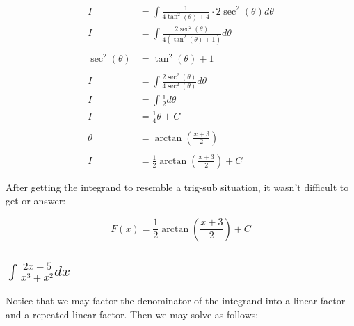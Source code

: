 \documentclass[12pt]{article}
\begin{document}
\begin{align}
    \nonumber                                                                                  \\
    I              & = \int \frac{1}{4\tan^2(\theta) + 4} \cdot 2\sec^2(\theta) d\theta        \\
    I              & = \int \frac{2\sec^2(\theta)}{4(\tan^2(\theta) + 1)} d\theta              \\
    \nonumber                                                                                  \\
    \sec^2(\theta) & = \tan^2(\theta) + 1                                                      \\
    \nonumber                                                                                  \\
    I              & = \int \frac{2\sec^2(\theta)}{4\sec^2(\theta)} d\theta                    \\
    I              & = \int \frac{1}{2} d\theta                                                \\
    I              & = \frac{1}{4} \theta + C                                                  \\
    \nonumber                                                                                  \\
    \theta         & = \arctan\left(\frac{x+3}{2}\right)                                       \\
    \nonumber                                                                                  \\
    I              & = \frac{1}{2} \arctan\left(\frac{x+3}{2}\right) + C
\end{align}


After getting the integrand to resemble a trig-sub situation, it wasn't difficult to get or answer:

$$
    F(x) = \frac{1}{2} \arctan\left(\frac{x+3}{2}\right) + C
$$

\subsection{$\int \frac{2x-5}{x^3+x^2} dx$}

Notice that we may factor the denominator of the integrand into a linear factor and a repeated linear factor.
Then we may solve as follows:
\end{document}
